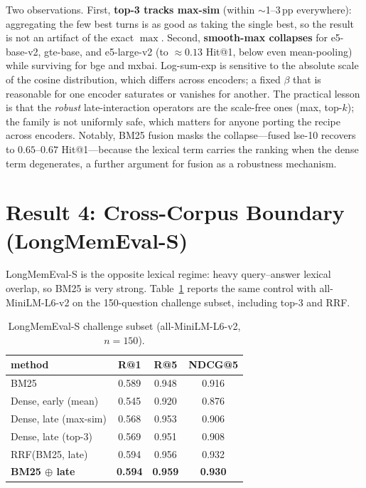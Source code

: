 \documentclass[10pt,twocolumn]{article}
\newcommand{\oxor}{\ensuremath{\oplus}}
\begin{document}
Two observations. First, \textbf{top-3 tracks max-sim} (within $\sim$1--3\,pp
everywhere): aggregating the few best turns is as good as taking the single
best, so the result is not an artifact of the exact $\max$. Second,
\textbf{smooth-max collapses} for e5-base-v2, gte-base, and e5-large-v2 (to
$\approx0.13$ Hit@1, below even mean-pooling) while surviving for bge and
mxbai. Log-sum-exp is sensitive to the absolute scale of the cosine
distribution, which differs across encoders; a fixed $\beta$ that is
reasonable for one encoder saturates or vanishes for another. The practical
lesson is that the \emph{robust} late-interaction operators are the
scale-free ones (max, top-$k$); the family is not uniformly safe, which
matters for anyone porting the recipe across encoders. Notably, BM25 fusion
masks the collapse---fused lse-10 recovers to $0.65$--$0.67$ Hit@1---because
the lexical term carries the ranking when the dense term degenerates, a
further argument for fusion as a robustness mechanism.

\section{Result 4: Cross-Corpus Boundary (LongMemEval-S)}
\label{sec:cross}
LongMemEval-S is the opposite lexical regime: heavy query--answer lexical
overlap, so BM25 is very strong. Table~\ref{tab:lme} reports the same control
with all-MiniLM-L6-v2 on the 150-question challenge subset, including top-3
and RRF.

\begin{table}[t]
\centering\small
\caption{LongMemEval-S challenge subset (all-MiniLM-L6-v2, $n{=}150$).}
\label{tab:lme}
\begin{tabular}{lccc}
\toprule
method & R@1 & R@5 & NDCG@5 \\
\midrule
BM25 & 0.589 & 0.948 & 0.916 \\
Dense, early (mean) & 0.545 & 0.920 & 0.876 \\
Dense, late (max-sim) & 0.568 & 0.953 & 0.906 \\
Dense, late (top-3) & 0.569 & 0.951 & 0.908 \\
RRF(BM25, late) & 0.594 & 0.956 & 0.932 \\
\textbf{BM25 \oxor{} late} & \textbf{0.594} & \textbf{0.959} & \textbf{0.930} \\
\bottomrule
\end{tabular}
\end{table}
\end{document}
